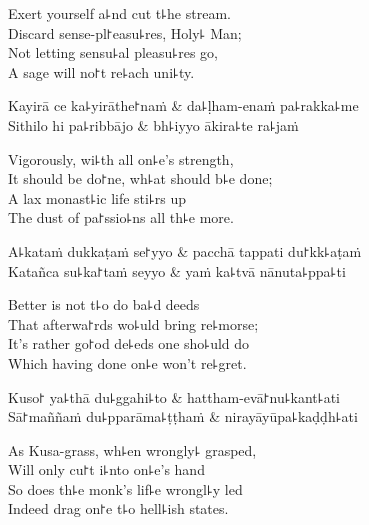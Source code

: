 \begin{english}
  Exert yourself a꜕nd cut t꜕he stream.\\
  Discard sense-pl꜓easu꜕res, Holy꜕ Man;\\
  Not letting sensu꜕al pleasu꜕res go,\\
  A sage will no꜓t re꜕ach uni꜕ty.
\end{english}

\begin{twochants}
  Kayirā ce ka꜕yirāthe꜓naṁ & da꜕ḷham-enaṁ pa꜕rakka꜕me \\
  Sithilo hi pa꜕ribbājo & bh꜕iyyo ākira꜕te ra꜕jaṁ \\
\end{twochants}

\begin{english}
  Vigorously, wi꜕th all on꜕e's strength,\\
  It should be do꜓ne, wh꜕at should b꜕e done;\\
  A lax monast꜕ic life sti꜕rs up\\
  The dust of pa꜓ssio꜕ns all th꜕e more.
\end{english}

\begin{twochants}
  A꜕kataṁ dukkaṭaṁ se꜓yyo & pacchā tappati du꜓kk꜕aṭaṁ \\
  Katañca su꜕ka꜓taṁ seyyo & yaṁ ka꜕tvā nānuta꜕ppa꜕ti \\
\end{twochants}

\begin{english}
  Better is not t꜕o do ba꜕d deeds\\
  That afterwa꜓rds wo꜕uld bring re꜕morse;\\
  It's rather go꜓od de꜕eds one sho꜕uld do\\
  Which having done on꜕e won't re꜕gret.
\end{english}

\clearpage

\begin{twochants}
  Kuso꜓ ya꜕thā du꜕ggahi꜕to & hattham-evā꜓nu꜕kant꜕ati \\
  Sā꜓maññaṁ du꜕pparāma꜕ṭṭhaṁ & nirayāyūpa꜕kaḍḍh꜕ati \\
\end{twochants}

\begin{english}
  As Kusa-grass, wh꜕en wrongly꜕ grasped,\\
  Will only cu꜓t i꜕nto on꜕e's hand\\
  So does th꜕e monk's lif꜕e wrongl꜕y led\\
  Indeed drag on꜓e t꜕o hell꜕ish states.
\end{english}

